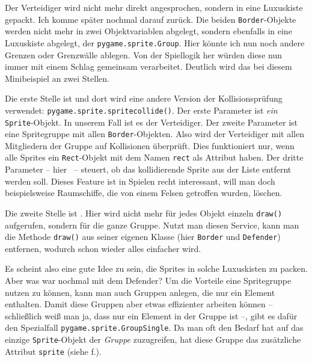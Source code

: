 
Der Verteidiger wird nicht mehr direkt angesprochen, sondern in eine Luxuskiste gepackt. Ich komme später nochmal darauf zurück. Die beiden \texttt{Border}-Objekte werden nicht mehr in zwei Objektvariablen abgelegt, sondern ebenfalls in eine Luxuskiste abgelegt, der \texttt{pygame.sprite.Group}. Hier könnte ich nun noch andere Grenzen oder Grenzwälle ablegen. Von der Spiellogik her würden diese nun immer mit einem Schlag gemeinsam verarbeitet. Deutlich wird das bei diesem Minibeispiel an zwei Stellen.

Die erste Stelle ist  und dort wird eine andere Version der Kollisionsprüfung verwendet: \texttt{pygame.sprite.\-sprite\-collide()}. Der erste Parameter ist \emph{ein} \texttt{Sprite}-Objekt. In unserem Fall ist es der Verteidiger. Der zweite Parameter ist eine Spritegruppe mit allen \texttt{Border}-Objekten. Also wird der Verteidiger mit allen Mitgliedern der Gruppe auf Kollisionen überprüft. Dies funktioniert nur, wenn alle Sprites ein \texttt{Rect}-Objekt mit dem Namen \texttt{rect} als Attribut haben. Der dritte Parameter -- hier \false\ -- steuert, ob das kollidierende Sprite aus der Liste entfernt werden soll. Dieses Feature ist in Spielen recht interessant, will man doch beispielsweise Raumschiffe, die von einem Felsen getroffen wurden, löschen.

Die zweite Stelle ist . Hier wird nicht mehr für jedes Objekt einzeln \texttt{draw()} aufgerufen, sondern für die ganze Gruppe. Nutzt man diesen Service, kann man die Methode \texttt{draw()} aus seiner eigenen Klasse (hier \texttt{Border} und \texttt{Defender}) entfernen, wodurch schon wieder alles einfacher wird.

Es scheint also eine gute Idee zu sein, die Sprites in solche Luxuskisten zu packen. Aber was war nochmal mit dem Defender? Um die Vorteile eine Spritegruppe nutzen zu können, kann man auch Gruppen anlegen, die nur ein Element enthalten. Damit diese Gruppen aber etwas effizienter arbeiten können -- schließlich weiß man ja, dass nur ein Element in der Gruppe ist --, gibt es dafür den Spezialfall \texttt{pygame.sprite.GroupSingle}. Da man oft den Bedarf hat auf das einzige \texttt{Sprite}-Objekt der \emph{Gruppe} zuzugreifen, hat diese Gruppe das zusätzliche Attribut \texttt{sprite} (siehe f.).


